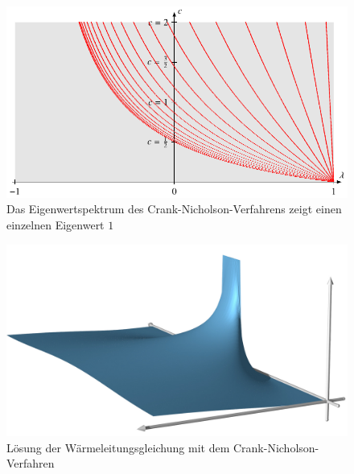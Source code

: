 \begin{figure}
\centering
\includegraphics{chapters/70-pde/images/cnspektrum.pdf}
\caption{Das Eigenwertspektrum des Crank-Nicholson-Verfahrens zeigt
einen einzelnen Eigenwert $1$ 
\label{buch:pde:waerme:cranknicholson:spektrum}}
\end{figure}
\begin{figure}
\centering
\includegraphics[width=\hsize]{chapters/70-pde/images/cranknicholson.jpg}
\caption{Lösung der Wärmeleitungsgleichung mit dem Crank-Nicholson-Verfahren
\label{buch:pde:waerme:figure:cranknicholson}}
\end{figure}

